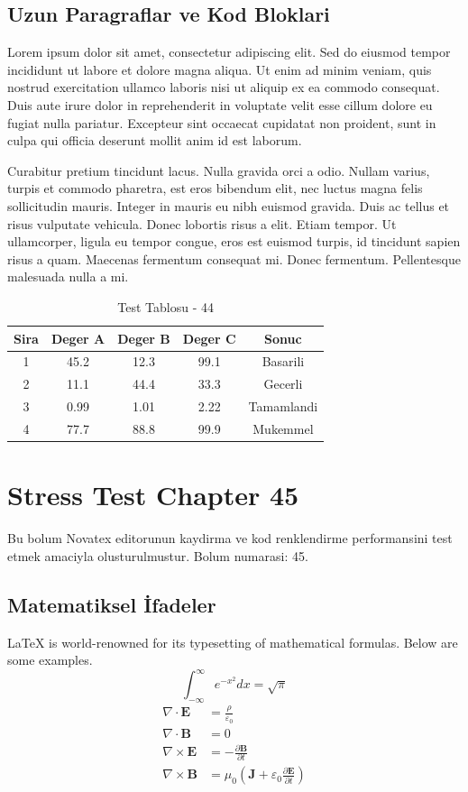 \documentclass[12pt,a4paper]{article}
\begin{document}
\subsection{Uzun Paragraflar ve Kod Bloklari}
Lorem ipsum dolor sit amet, consectetur adipiscing elit. Sed do eiusmod tempor incididunt ut labore et dolore magna aliqua. Ut enim ad minim veniam, quis nostrud exercitation ullamco laboris nisi ut aliquip ex ea commodo consequat. Duis aute irure dolor in reprehenderit in voluptate velit esse cillum dolore eu fugiat nulla pariatur. Excepteur sint occaecat cupidatat non proident, sunt in culpa qui officia deserunt mollit anim id est laborum.

Curabitur pretium tincidunt lacus. Nulla gravida orci a odio. Nullam varius, turpis et commodo pharetra, est eros bibendum elit, nec luctus magna felis sollicitudin mauris. Integer in mauris eu nibh euismod gravida. Duis ac tellus et risus vulputate vehicula. Donec lobortis risus a elit. Etiam tempor. Ut ullamcorper, ligula eu tempor congue, eros est euismod turpis, id tincidunt sapien risus a quam. Maecenas fermentum consequat mi. Donec fermentum. Pellentesque malesuada nulla a mi.

\begin{table}[h!]
\centering
\begin{tabular}{|c|c|c|c|c|}
\hline
\textbf{Sira} & \textbf{Deger A} & \textbf{Deger B} & \textbf{Deger C} & \textbf{Sonuc} \\
\hline
1 & 45.2 & 12.3 & 99.1 & Basarili \\
2 & 11.1 & 44.4 & 33.3 & Gecerli \\
3 & 0.99 & 1.01 & 2.22 & Tamamlandi \\
4 & 77.7 & 88.8 & 99.9 & Mukemmel \\
\hline
\end{tabular}
\caption{Test Tablosu - 44}
\end{table}

\newpage
\section{Stress Test Chapter 45}
Bu bolum Novatex editorunun kaydirma ve kod renklendirme performansini test etmek amaciyla olusturulmustur. Bolum numarasi: 45.

\subsection{Matematiksel İfadeler}
\LaTeX{} is world-renowned for its typesetting of mathematical formulas. Below are some examples.
\begin{equation}
\int_{-\infty}^{\infty} e^{-x^2} dx = \sqrt{\pi}
\end{equation}
\begin{align}
\nabla \cdot \mathbf{E} &= \frac{\rho}{\varepsilon_0} \\
\nabla \cdot \mathbf{B} &= 0 \\
\nabla \times \mathbf{E} &= -\frac{\partial \mathbf{B}}{\partial t} \\
\nabla \times \mathbf{B} &= \mu_0\left(\mathbf{J} + \varepsilon_0 \frac{\partial \mathbf{E}}{\partial t}\right)
\end{align}
\end{document}
